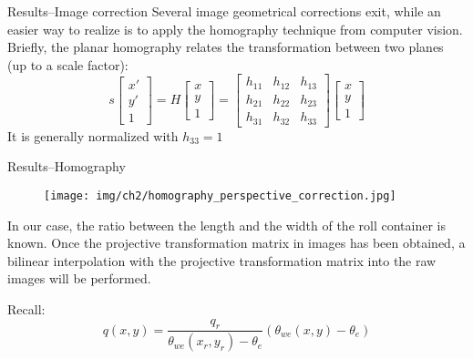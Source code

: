 \begin{frame}{Results--\small{Image correction}}
    Several image geometrical corrections exit, while an easier way to realize is to apply the \alert{homography} technique from computer vision.\\
    \pause
    Briefly, the planar homography relates the transformation between two planes (up to a scale factor):
    \begin{equation*}
        s\begin{bmatrix}
        x'\\y'\\1
        \end{bmatrix}
        =H \begin{bmatrix}
        x\\y\\1
        \end{bmatrix}
        = \begin{bmatrix}
        h_{11} & h_{12} & h_{13}\\h_{21} & h_{22} & h_{23}\\h_{31} & h_{32} & h_{33}
        \end{bmatrix}
        \begin{bmatrix}
        x\\y\\1
        \end{bmatrix}
    \end{equation*}
It is generally normalized with $h_{33}=1$
\end{frame}

\begin{frame}{Results--\small{Homography}}
    \begin{figure}[ht]
        \centering
        \texttt{[image: img/ch2/homography\_perspective\_correction.jpg]}
    \end{figure}
    \pause
    In our case, the ratio between the length and the width of the roll container is known. Once the projective transformation matrix in images has been obtained, a bilinear interpolation with the projective transformation matrix into the raw images will be performed.

    Recall: 
        \begin{equation*}
            q(x,y) = \frac{q_r}{\theta_{we}(x_r,y_r)-\theta_e}(\theta_{we}(x,y)-\theta_e)
        \end{equation*}
\end{frame}


